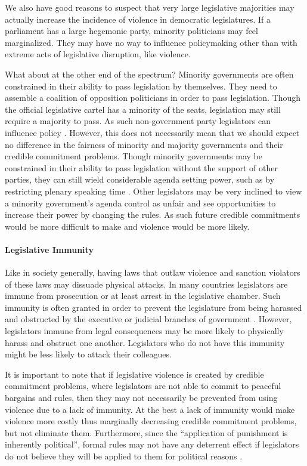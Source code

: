 \documentclass[a4paper]{article}\usepackage[]{graphicx}\usepackage[]{color}
\begin{document}
We also have good reasons to suspect that very large legislative majorities may actually increase the incidence of violence in democratic legislatures. If a parliament has a large hegemonic party, minority politicians may feel marginalized. They may have no way to influence policymaking other than with extreme acts of legislative disruption, like violence.

What about at the other end of the spectrum? Minority governments are often constrained in their ability to pass legislation by themselves. They need to assemble a coalition of opposition politicians in order to pass legislation. Though the official legislative cartel has a minority of the seats, legislation may still require a majority to pass. As such non-government party legislators can influence policy \citep{strom1990minority}. However, this does not necessarily mean that we should expect no difference in the fairness of minority and majority governments and their credible commitment problems. Though minority governments may be constrained in their ability to pass legislation without the support of other parties, they can still wield considerable agenda setting power, such as by restricting plenary speaking time \citep{Tsebelis2002,cox2005,cox2007}. Other legislators may be very inclined to view a minority government's agenda control as unfair and see opportunities to increase their power by changing the rules. As such future credible commitments would be more difficult to make and violence would be more likely.

\paragraph{Legislative Immunity}

Like in society generally, having laws that outlaw violence and sanction violators of these laws may dissuade physical attacks. In many countries legislators are immune from prosecution or at least arrest in the legislative chamber. Such immunity is often granted in order to prevent the legislature from being harassed and obstructed by the executive or judicial branches of government  \citep{Seghetti1984}. However, legislators immune from legal consequences may be more likely to physically harass and obstruct one another. Legislators who do not have this immunity might be less likely to attack their colleagues.

It is important to note that if legislative violence is created by credible commitment problems, where legislators are not able to commit to peaceful bargains and rules, then they may not necessarily be prevented from using violence due to a lack of immunity. At the best a lack of immunity would make violence more costly thus marginally decreasing credible commitment problems, but not eliminate them. Furthermore, since the ``application of punishment is inherently political'', formal rules may not have any deterrent effect if legislators do not believe they will be applied to them for political reasons \cite[58]{Wolfe2004}.
\end{document}
